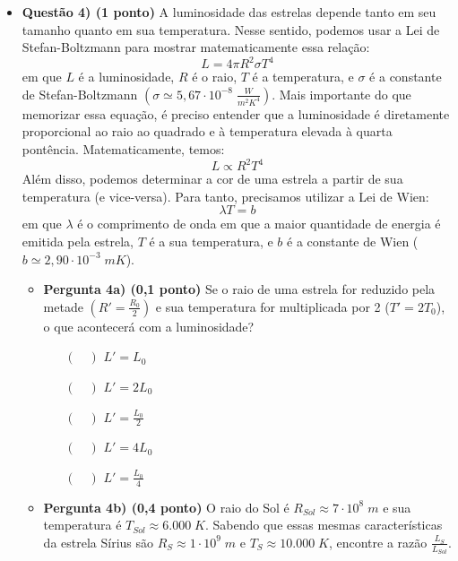 \documentclass[a4paper, 12pt]{article}
\begin{document}
\begin{flushleft}
\begin{itemize}
		\item \textbf{Questão 4) (1 ponto)} A luminosidade das estrelas depende tanto em seu tamanho quanto em sua temperatura. Nesse sentido, podemos usar a Lei de Stefan-Boltzmann para mostrar matematicamente essa relação:
			$$L=4 \pi R^2 \sigma T^4$$
			em que $L$ é a luminosidade, $R$ é o raio, $T$ é a temperatura, e $\sigma$ é a constante de Stefan-Boltzmann $\left( \sigma \simeq 5,67 \cdot 10^{-8} \; \frac{W}{m^2K^4} \right)$. \linebreak \linebreak
			Mais importante do que memorizar essa equação, é preciso entender que a luminosidade é diretamente proporcional ao raio ao quadrado e à temperatura elevada à quarta pontência. Matematicamente, temos:
				$$L \propto R^2 T^4$$
			Além disso, podemos determinar a cor de uma estrela a partir de sua temperatura (e vice-versa). Para tanto, precisamos utilizar a Lei de Wien:
				$$\lambda T = b$$
				em que $\lambda$ é o comprimento de onda em que a maior quantidade de energia é emitida pela estrela, $T$ é a sua temperatura, e $b$ é a constante de Wien ($b \simeq 2,90 \cdot 10^{-3} \; mK$). \linebreak \linebreak
				\begin{itemize}
					\item \textbf{Pergunta 4a) (0,1 ponto)} Se o raio de uma estrela for reduzido pela metade $\left( R'=\frac{R_0}{2} \right)$ e sua temperatura for multiplicada por 2 ($T'=2T_0$), o que acontecerá com a luminosidade?
						\begin{itemize}
							\item[$(\quad)$] $L'=L_0$
							\item[$(\quad)$] $L'=2L_0$
							\item[$(\quad)$] $L'=\frac{L_0}{2}$
							\item[$(\quad)$] $L'=4L_0$
							\item[$(\quad)$] $L'=\frac{L_0}{4}$
						\end{itemize}
					\item \textbf{Pergunta 4b) (0,4 ponto)} O raio do Sol é $R_{Sol} \approx 7 \cdot 10^8 \; m$ e sua temperatura é $T_{Sol} \approx 6.000 \; K$. Sabendo que essas mesmas características da estrela Sírius são $R_S \approx 1 \cdot 10^9 \; m$ e $T_S \approx 10.000 \; K$, encontre a razão $\frac{L_S}{L_{Sol}}$.
						\linebreak \linebreak \linebreak \linebreak \linebreak \linebreak \linebreak \linebreak \linebreak

\end{itemize}
\end{itemize}
\end{flushleft}
\end{document}
